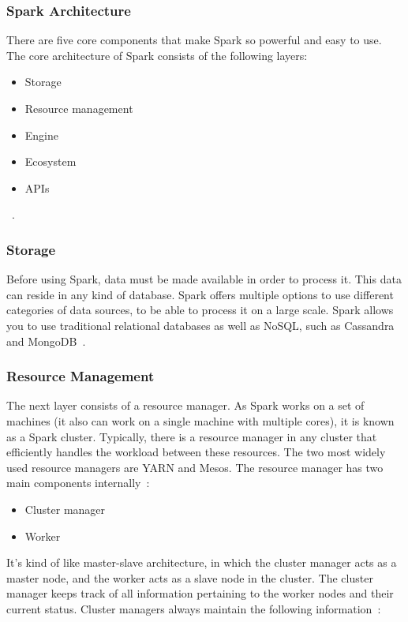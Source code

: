 \documentclass[]{final_report}
\begin{document}
\subsubsection{Spark Architecture}

There are five core components that make Spark so powerful and easy to use. The core architecture of Spark consists of the following layers:

\begin{itemize}
    \item Storage
    \item Resource management
    \item Engine
    \item Ecosystem
    \item APIs
\end{itemize}
~\cite{singh_manage_2022}.
\subsubsection{Storage}
Before using Spark, data must be made available in order to process it. This data can reside in any kind of database. Spark offers multiple options to use different categories of data sources, to be able to process it on a large scale. Spark allows you to use traditional relational databases as well as NoSQL, such as Cassandra and MongoDB~\cite{singh_manage_2022}.

\subsubsection{Resource Management}
The next layer consists of a resource manager. As Spark works on a set of machines (it also can work on a single machine with multiple cores), it is known as a Spark cluster. Typically, there is a resource manager in any cluster that efficiently handles the workload between these resources. The two most widely used resource managers are YARN and Mesos. The resource manager has two main components internally~\cite{singh_manage_2022}:

\begin{itemize}
    \item Cluster manager
    \item Worker
\end{itemize}

It’s kind of like master-slave architecture, in which the cluster manager acts as a master node, and the worker acts as a slave node in the cluster. The cluster manager keeps track of all information pertaining to the worker nodes and their current status. Cluster managers always maintain the following information~\cite{singh_manage_2022}:
\end{document}
